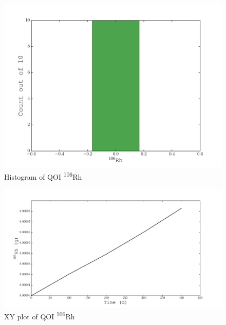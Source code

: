 \documentclass[11pt,notitlepage]{article}
\newcommand{\tss}{\textsuperscript}
\begin{document}
  \begin{figure}[H]
    \begin{center}
      \includegraphics[width=0.77\columnwidth]{../Origen2/PLOTS/RH106Post_HIST.pdf}
      \vspace{-5mm}
      \caption{Histogram of QOI \tss{106}Rh}
      \label{fig:POSTHISTRh106}
    \end{center}
  \end{figure}

    \begin{figure}[H]
    \begin{center}
      \includegraphics[width=0.77\columnwidth]{../Origen2/PLOTS/RH106Post_XY.pdf}
      \vspace{-5mm}
      \caption{XY plot of QOI \tss{106}Rh}
      \label{fig:POSTXYRh106}
    \end{center}
  \end{figure}
\end{document}
